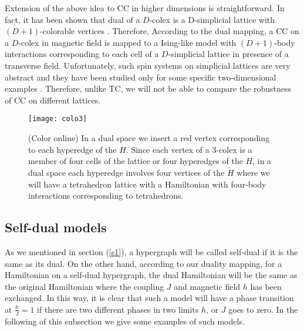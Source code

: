 \documentclass[preprintnumbers, showpacs, floatfix,twocolumn,
preprintnumbers, superscriptaddress]{revtex4}
\begin{document}
Extension of the above idea to CC in higher dimensions is straightforward. In fact, it has been shown that dual of a $D$-colex is a D-simplicial lattice with $(D+1)$-colorable vertices \cite{Bombin2015}. Therefore, According to the dual mapping, a CC on a $D$-colex in magnetic field is mapped to a Ising-like model with $(D+1)$-body interactions corresponding to each cell of a $D$-simplicial lattice in presence of a transverse field. Unfortunately, such spin systems on simplicial lattices are very abstract and they have been studied only for some specific two-dimensional examples \cite{baxterwu}. Therefore, unlike TC, we will not be able to compare the robustness of CC on different lattices.
\begin{figure}[t]
\centering
\texttt{[image: colo3]}
\caption{(Color online) In a dual space we insert a red vertex corresponding to each hyperedge of the $H$. Since each vertex of a 3-colex is a member of four cells of the lattice or four hyperedges of the $H$, in a dual space each hyperedge involves four vertices of the $\tilde{H}$ where we will have a tetrahedron lattice with a Hamiltonian with four-body interactions corresponding to tetrahedrons.} \label{colo3}
\end{figure}

\subsection{Self-dual models}
As we mentioned in section (\ref{s1}), a hypergraph will be called self-dual if it is the same as its dual. On the other hand, according to our duality mapping, for a Hamiltonian on a self-dual hypergraph, the dual Hamiltonian will be the same as the original Hamiltonian where the coupling $J$ and magnetic field $h$ has been exchanged. In this way, it is clear that such a model will have a phase transition at $\frac{h}{J}=1$ if there are two different phases in two limits $h$, or $J$ goes to zero. In the following of this subsection we give some examples of such models.
\end{document}
